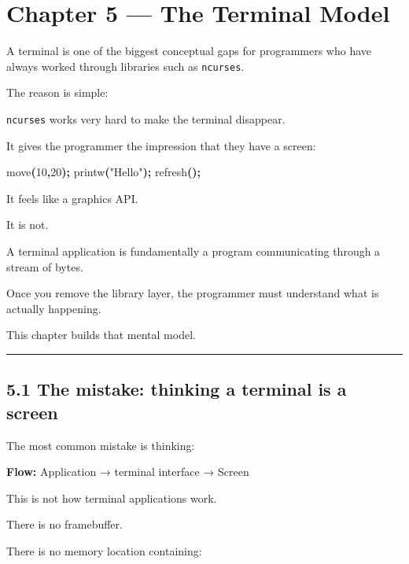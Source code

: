 \documentclass[
  oneside,
  openany]{book}
\newenvironment{Shaded}{\begin{snugshade}}{\end{snugshade}}
\newcommand{\DecValTok}[1]{\textcolor[rgb]{0.00,0.00,0.81}{#1}}
\newcommand{\NormalTok}[1]{#1}
\newcommand{\OperatorTok}[1]{\textcolor[rgb]{0.81,0.36,0.00}{\textbf{#1}}}
\newcommand{\StringTok}[1]{\textcolor[rgb]{0.31,0.60,0.02}{#1}}
\begin{document}
\hypertarget{chapter-5-the-terminal-model}{%
\chapter{Chapter 5 --- The Terminal
Model}\label{chapter-5-the-terminal-model}}

A terminal is one of the biggest conceptual gaps for programmers who
have always worked through libraries such as \texttt{ncurses}.

The reason is simple:

\texttt{ncurses} works very hard to make the terminal disappear.

It gives the programmer the impression that they have a screen:

\begin{Shaded}
\begin{Highlighting}[]
\NormalTok{move}\OperatorTok{(}\DecValTok{10}\OperatorTok{,}\DecValTok{20}\OperatorTok{);}
\NormalTok{printw}\OperatorTok{(}\StringTok{"Hello"}\OperatorTok{);}
\NormalTok{refresh}\OperatorTok{();}
\end{Highlighting}
\end{Shaded}

It feels like a graphics API.

It is not.

A terminal application is fundamentally a program communicating through
a stream of bytes.

Once you remove the library layer, the programmer must understand what
is actually happening.

This chapter builds that mental model.

\begin{center}\rule{0.5\linewidth}{0.5pt}\end{center}

\hypertarget{the-mistake-thinking-a-terminal-is-a-screen}{%
\section{5.1 The mistake: thinking a terminal is a
screen}\label{the-mistake-thinking-a-terminal-is-a-screen}}

The most common mistake is thinking:

\textbf{Flow:} Application → terminal interface → Screen

This is not how terminal applications work.

There is no framebuffer.

There is no memory location containing:
\end{document}
